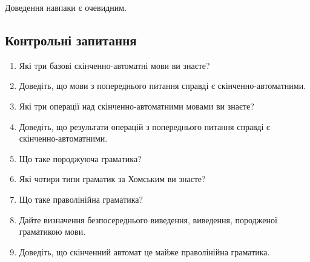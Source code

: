 Доведення навпаки є очевидним.

\subsection{Контрольні запитання}

\begin{enumerate}
	\item Які три базові скінченно-автоматні мови ви знаєте? %
	\item Доведіть, що мови з попереднього питання справді є скінченно-автоматними.
	\item Які три операції над скінченно-автоматними мовами ви знаєте? %
	\item Доведіть, що результати операцій з попереднього питання справді є скінченно-автоматними.
	\item Що таке породжуюча граматика? %
	\item Які чотири типи граматик за Хомським ви знаєте? %
	\item Що таке праволінійна граматика? %
	\item Дайте визначення безпосереднього виведення, виведення, породженої граматикою мови.
	\item Доведіть, що скінченний автомат це майже праволінійна граматика.
\end{enumerate}
